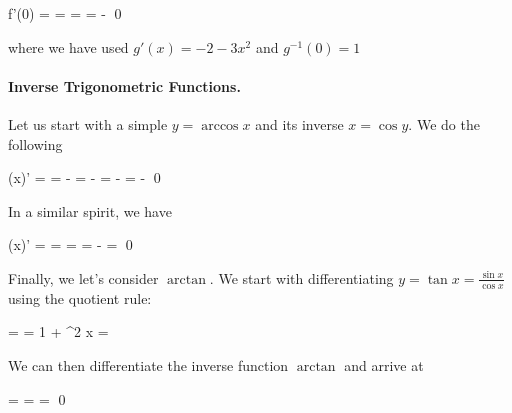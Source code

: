 \bee
f'(0) =  =  =  = -  \qed
\eee

where we have used $g'(x) = -2 - 3x^2$ and $g^{-1}(0) = 1$

\paragraph{Inverse Trigonometric Functions.} Let us start with a simple $y = \arccos x$ and its inverse $x = \cos y$. We do the following

\bee
(\arccos x)' =  = -  = -  = -  = -  \qed
\eee

In a similar spirit, we have

\bee
(\arcsin x)' =  =  =  = -  =  \qed
\eee

Finally, we let's consider $\arctan$. We start with differentiating $y = \tan x = \frac{\sin x}{\cos x}$ using the quotient rule:

\bee
{} =  = 1 + \tan^2 x = 
\eee

We can then differentiate the inverse function $\arctan$ and arrive at

\bee
{} =  =  =  \qed
\eee